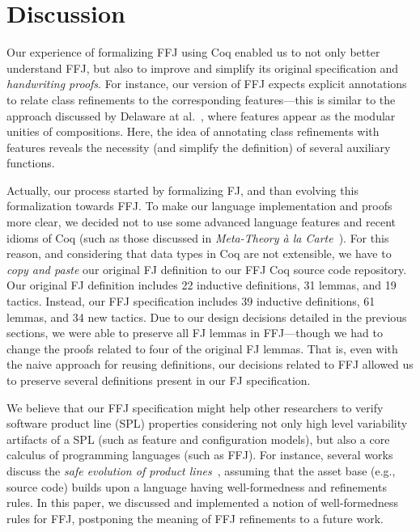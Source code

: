 \section{Discussion}\label{seq:impl}

Our experience of formalizing \ac{FFJ} 
using Coq enabled us to 
not only better understand \ac{FFJ}, but also to improve and 
simplify its original specification and \emph{handwriting 
proofs}. For instance, our version of \ac{FFJ} expects 
explicit annotations to relate class refinements to the 
corresponding features---this is similar to the 
approach discussed by Delaware at al.~\cite{delaware:fse-2009}, 
where features appear as the modular unities of compositions. 
{\color{blue}Here, the idea of annotating class refinements 
with features reveals the necessity (and simplify the definition) 
of several auxiliary functions.} 

Actually, our process started by formalizing \ac{FJ}, 
and than evolving this formalization towards \ac{FFJ}. 
To make our language implementation and proofs more clear, 
we decided not to use some advanced language features 
and recent idioms of Coq (such as those discussed in \emph{Meta-Theory \`{a} la Carte}~\cite{}). 
For this reason, and considering that data types in Coq are not extensible, 
we have to \emph{copy and paste} our original \ac{FJ} definition 
to our \ac{FFJ} Coq source code repository. Our original \ac{FJ} 
definition includes 22 inductive definitions, 31 lemmas, and 
19 tactics. Instead, our \ac{FFJ} specification includes 
39 inductive definitions, 61 lemmas, and 34 new tactics. Due to our 
design decisions detailed in the previous sections, 
we were able to preserve all \ac{FJ} lemmas in \ac{FFJ}---though 
we had to change the proofs related to four of the original \ac{FJ} 
lemmas. That is, even with the naive approach for reusing 
definitions, our decisions related to \ac{FFJ} 
allowed us to preserve several definitions present 
in our \ac{FJ} specification. 

We believe that our \ac{FFJ} specification might 
help other researchers to verify software product 
line (SPL) properties considering not only high level 
variability artifacts of a SPL (such as feature and configuration 
models), but also a core calculus of programming 
languages (such as \ac{FFJ}). For instance, 
several works discuss the \emph{safe evolution 
of product lines}~\cite{}, assuming that the asset 
base (e.g., source code) builds upon a 
language having well-formedness and 
refinements rules. In this paper, we discussed and implemented a 
notion of well-formedness rules for \ac{FFJ}, postponing 
the meaning of \ac{FFJ} refinements to a future work.  

 
